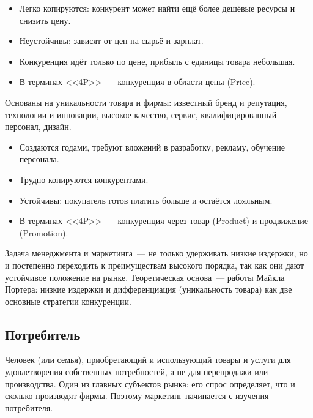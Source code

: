 \documentclass[12pt]{article}
\begin{document}
	\begin{itemize}
		\item Легко копируются: конкурент может найти ещё более дешёвые ресурсы и снизить цену.
		\item Неустойчивы: зависят от цен на сырьё и зарплат.
		\item Конкуренция идёт только по цене, прибыль с единицы товара небольшая.
		\item В терминах <<4P>>~--- конкуренция в области цены (Price).
	\end{itemize}
	
	\begin{definition}
		Основаны на уникальности товара и фирмы: известный бренд и репутация, технологии и инновации, высокое качество, сервис, квалифицированный персонал, дизайн.
	\end{definition}
	
	\begin{itemize}
		\item Создаются годами, требуют вложений в разработку, рекламу, обучение персонала.
		\item Трудно копируются конкурентами.
		\item Устойчивы: покупатель готов платить больше и остаётся лояльным.
		\item В терминах <<4P>>~--- конкуренция через товар (Product) и продвижение (Promotion).
	\end{itemize}
	
	\begin{note}
		Задача менеджмента и маркетинга~--- не только удерживать низкие издержки, но и постепенно переходить к преимуществам высокого порядка, так как они дают устойчивое положение на рынке. Теоретическая основа~--- работы Майкла Портера: низкие издержки и дифференциация (уникальность товара) как две основные стратегии конкуренции.
	\end{note}
	
	\subsection{Потребитель}
	
	\begin{definition}[Потребитель]
		Человек (или семья), приобретающий и использующий товары и услуги для удовлетворения собственных потребностей, а не для перепродажи или производства. Один из главных субъектов рынка: его спрос определяет, что и сколько производят фирмы. Поэтому маркетинг начинается с изучения потребителя.
	\end{definition}
	
\end{document}
